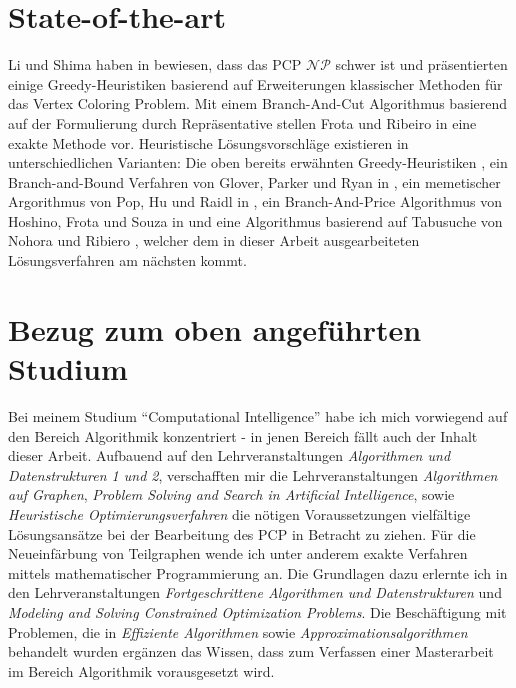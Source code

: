 \documentclass{article}
\begin{document}
\section{State-of-the-art}

Li und Shima haben in \cite{li-00} bewiesen, dass das PCP $\mathcal{NP}$ schwer ist und präsentier\-ten einige Greedy-Heuristiken basierend auf Erweiterungen klassischer Methoden für das Vertex Coloring Problem. Mit einem Branch-And-Cut Algorithmus basierend auf der Formulierung durch Repräsentative stellen Frota und Ribeiro in \cite{frota-07} eine exakte Methode vor. Heuristische Lösungsvorschläge existieren in unterschiedlichen Varianten: Die oben bereits erwähnten Greedy-Heuristiken \cite{li-00}, ein Branch-and-Bound Verfahren von Glover, Parker und Ryan in \cite{Glover-96}, ein memetischer Argorithmus von Pop, Hu und Raidl in \cite{pop-13}, ein Branch-And-Price Algorithmus von Hoshino, Frota und Souza in \cite{hoshino-11} und eine Algorithmus basierend auf Tabusuche von Nohora und Ribiero \cite{noronha-06}, welcher dem in dieser Arbeit ausgearbeiteten Lösungsverfahren am nächsten kommt.
 

\section{Bezug zum oben angeführten Studium}

Bei meinem Studium ``Computational Intelligence'' habe ich mich vorwiegend auf den Bereich Algorithmik konzentriert - in jenen Bereich fällt auch der Inhalt dieser Arbeit. Aufbauend auf den Lehrveranstaltungen \textit{Algorithmen und Datenstrukturen 1 und 2}, verschafften mir die Lehrveranstaltungen \textit{Algorithmen auf Graphen}, \textit{Problem Solving and Search in Artificial Intelligence}, sowie \textit{Heuristische Optimierungsverfahren} die nötigen Voraussetzungen vielfältige Lösungsansätze bei der Bearbeitung des PCP in Betracht zu ziehen. Für die Neueinfärbung von Teilgraphen wende ich unter anderem exakte Verfahren mittels mathematischer Programmierung an. Die Grundlagen dazu erlernte ich in den Lehrveranstaltungen \textit{Fortgeschrittene Algorithmen und Datenstrukturen} und \textit{Modeling and Solving Constrained Optimization Problems}. Die Beschäftigung mit Problemen, die in \textit{Effiziente Algorithmen} sowie \textit{Approximationsalgorithmen} behandelt wurden ergänzen das Wissen, dass zum Verfassen einer Masterarbeit im Bereich Algorithmik vorausgesetzt wird.

			     			      
\end{document}
